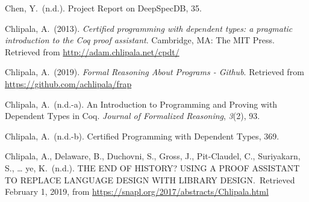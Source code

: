 \documentclass[12pt,twoside]{article}
\begin{document}
{\begin{thebibliography}{222}
\mdbibitemlabel{[Chen, n.d.]}Chen, Y.~(n.d.). Project Report on DeepSpecDB, 35.\label{chen_project_nodate}%

\mdbibitemlabel{[Chlipala, 2013]}Chlipala, A.~(2013). \emph{Certified programming with dependent types: a pragmatic introduction to the Coq proof assistant}. Cambridge, MA: The MIT Press. Retrieved from \href{http://adam.chlipala.net/cpdt/}{{\ttfamily http://\hspace{0pt}adam.\hspace{0pt}chlipala.\hspace{0pt}net/\hspace{0pt}cpdt/\hspace{0pt}}}\label{chlipala_certified_2013}%

\mdbibitemlabel{[Chlipala, 2019]}Chlipala, A.~(2019). \emph{Formal Reasoning About Programs - Github}. Retrieved from \href{https://github.com/achlipala/frap}{{\ttfamily https://\hspace{0pt}github.\hspace{0pt}com/\hspace{0pt}achlipala/\hspace{0pt}frap}}\label{chlipala_formal_2019}%

\mdbibitemlabel{[Chlipala, n.d.-a]}Chlipala, A.~(n.d.-a). An Introduction to Programming and Proving with Dependent Types in Coq. \emph{Journal of Formalized Reasoning}, \emph{3}(2), 93.\label{chlipala_introduction_nodate}%

\mdbibitemlabel{[Chlipala, n.d.-b]}Chlipala, A.~(n.d.-b). Certiﬁed Programming with Dependent Types, 369.\label{chlipala_certied_nodate}%

\mdbibitemlabel{[Chlipala et al., n.d.]}Chlipala, A., Delaware, B., Duchovni, S., Gross, J., Pit-Claudel, C., Suriyakarn, S., … ye, K.~(n.d.). THE END OF HISTORY? USING A PROOF ASSISTANT TO REPLACE LANGUAGE DESIGN WITH LIBRARY DESIGN.~Retrieved February 1, 2019, from \href{https://snapl.org/2017/abstracts/Chlipala.html}{{\ttfamily https://\hspace{0pt}snapl.\hspace{0pt}org/\hspace{0pt}2017/\hspace{0pt}abstracts/\hspace{0pt}Chlipala.\hspace{0pt}html}}\label{chlipala_end_nodate}%


\end{thebibliography}}
\end{document}
